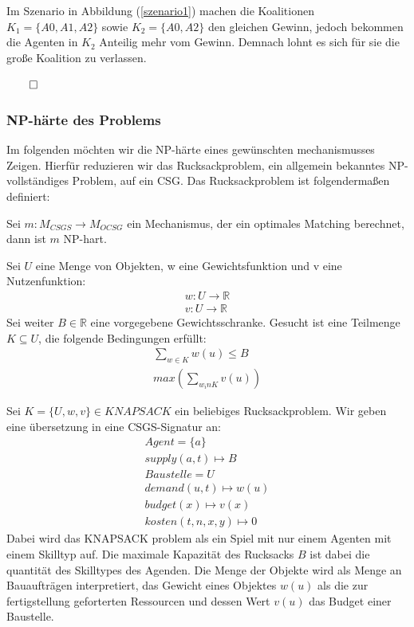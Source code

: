 Im Szenario in Abbildung (\ref{szenario1}) machen die Koalitionen $K_1 = \{A0, A1, A2\}$ sowie $K_2 = \{A0, A2\}$ den gleichen Gewinn, jedoch bekommen die Agenten in $K_2$ Anteilig mehr vom Gewinn. Demnach lohnt es sich für sie die große Koalition zu verlassen.
\begin{flushright}
  $\qed$
\end{flushright}

\subsubsection{NP-härte des Problems}
\label{np}
Im folgenden möchten wir die NP-härte eines gewünschten mechanismusses Zeigen. Hierfür reduzieren wir das Rucksackproblem, ein allgemein bekanntes NP-vollständiges Problem, auf ein CSG.
Das Rucksackproblem ist folgendermaßen definiert:

\begin{lemma}
Sei $m:M_{CSGS}\rightarrow M_{OCSG}$ ein Mechanismus, der ein optimales Matching berechnet, dann ist $m$ NP-hart.
\end{lemma}

\begin{definition}[KNAPSACK]
Sei $U$ eine Menge von Objekten, w eine Gewichtsfunktion und v eine Nutzenfunktion:
\begin{align}
  w: U\rightarrow \mathbb{R} \\
  v: U\rightarrow \mathbb{R}
\end{align}
Sei weiter $B\in\mathbb{R}$ eine vorgegebene Gewichtsschranke.
Gesucht ist eine Teilmenge $K\subseteq U$, die folgende Bedingungen erfüllt:
\begin{align}
  \sum_{w\in K}w(u)\leq B \label{bed1}\\
  max(\sum_{w_in K}v(u)) \label{bed2}
\end{align}
\end{definition}

Sei $K=\{U,w,v\}\in KNAPSACK$ ein beliebiges Rucksackproblem. Wir geben eine übersetzung in eine CSGS-Signatur an:
\begin{align}
  Agent = \{a\} \\
  supply(a, t) \mapsto B \\
  Baustelle = U \\
  demand(u, t) \mapsto w(u) \\
  budget(x) \mapsto v(x) \\
  kosten(t, n, x, y) \mapsto 0
\end{align}
Dabei wird das KNAPSACK problem als ein Spiel mit nur einem Agenten mit einem Skilltyp auf. Die maximale Kapazität des Rucksacks $B$ ist dabei die quantität des Skilltypes des Agenden. Die Menge der Objekte wird als Menge an Bauaufträgen interpretiert, das Gewicht eines Objektes $w(u)$ als die zur fertigstellung geforterten Ressourcen und dessen Wert $v(u)$ das Budget einer Baustelle.


